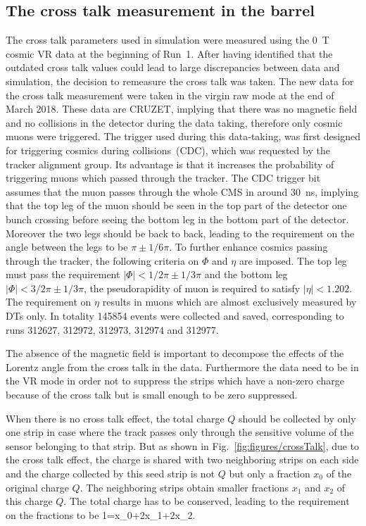 \subsection{The cross talk  measurement in the barrel~\label{sec:xtalkb}}

The cross talk parameters used in simulation were measured using the 0~T cosmic VR data at the beginning of Run~1. After having identified that the outdated cross talk values could lead to large discrepancies between data and simulation, the decision  to remeasure the cross talk was taken. The new data for the cross talk measurement were taken in the virgin raw mode at the end of March 2018. These data are CRUZET, implying that there was no magnetic field and no collisions in the detector during the data taking, therefore only cosmic muons were triggered. The trigger used during this data-taking, was first designed for triggering cosmics during collisions~(CDC), which was requested by the tracker alignment group. Its advantage is that it increases the probability of triggering muons which passed through the tracker. The CDC trigger bit~\cite{website:trigger} assumes that the muon passes through the whole CMS in around 30~ns, implying that the top leg of the muon should be seen in the top part of the detector one bunch crossing before seeing the bottom leg in the bottom part of the detector. Moreover the two legs should be back to back, leading to the requirement on the angle between the legs to be $\pi \pm 1/6\pi$. To further enhance cosmics passing through the tracker, the following criteria on $\Phi$ and $\eta$ are imposed. The top leg must pass the requirement $|\Phi|<1/2\pi \pm 1/3\pi$ and the bottom leg $|\Phi|<3/2\pi \pm 1/3\pi$, the pseudorapidity of muon is required to satisfy $|\eta|<1.202$. The requirement on $\eta$ results in muons which are almost exclusively measured by DTs only. In totality 145854 events were collected and saved, corresponding to runs 312627, 312972, 312973, 312974 and 312977.

The absence of the magnetic field is important to decompose the effects of the Lorentz angle from the cross talk in the data. Furthermore the data need to be in the VR mode in order not to suppress the strips which have a non-zero charge because of the cross talk but is small enough to be zero suppressed. 

When there is no cross talk effect, the total charge $Q$ should be collected by only one strip in case where the track passes only through the sensitive volume of the sensor belonging to that strip. But as shown in Fig.~\ref{fig:figures/crossTalk}, due to the cross talk effect, the charge is shared with two neighboring strips on each side and the charge collected by this seed strip is not $Q$ but only a fraction $x_{0}$ of the original charge $Q$. The neighboring strips obtain smaller fractions $x_{1}$ and $x_{2}$ of this charge $Q$. The total charge has to be conserved, leading to the requirement on the fractions to be 
{
1=x_{0}+2x_{1}+2x_{2}. 
}

